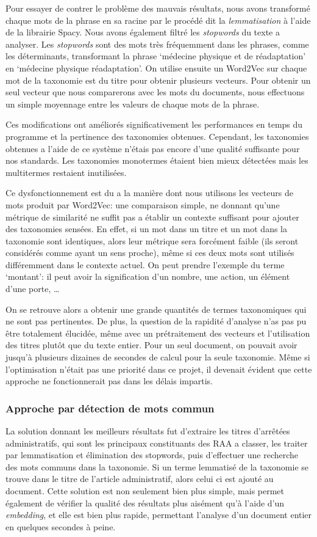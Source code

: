 Pour essayer de contrer le problème des mauvais résultats, nous avons transformé chaque mots de la phrase en sa racine par le procédé dit la \textit{lemmatisation} à l'aide de la librairie Spacy\cite{spacy}.
Nous avons également filtré les \textit{stopwords} du texte a analyser.
Les \textit{stopwords} sont des mots très fréquemment dans les phrases, comme les déterminants, transformant la phrase `médecine physique et de réadaptation' en `médecine physique réadaptation'.
On utilise ensuite un Word2Vec sur chaque mot de la taxonomie est du titre pour obtenir plusieurs vecteurs.
Pour obtenir un seul vecteur que nous comparerons avec les mots du documents, nous effectuons un simple moyennage entre les valeurs de chaque mots de la phrase.


Ces modifications ont améliorés significativement les performances en temps du programme et la pertinence des taxonomies obtenues.
Cependant, les taxonomies obtenues a l'aide de ce système n'étais pas encore d'une qualité suffisante pour nos standards.
Les taxonomies monotermes étaient bien mieux détectées mais les multitermes restaient inutilisées.


Ce dysfonctionnement est du a la manière dont nous utilisons les vecteurs de mots produit par Word2Vec: une comparaison simple, ne donnant qu'une métrique de similarité ne suffit pas a établir un contexte suffisant pour ajouter des taxonomies sensées.
En effet, si un mot dans un titre et un mot dans la taxonomie sont identiques, alors leur métrique sera forcément faible (ils seront considérés comme ayant un sens proche), même si ces deux mots sont utilisés différemment dans le contexte actuel.
On peut prendre l'exemple du terme `montant': il peut avoir la signification d'un nombre, une action, un élément d'une porte, \ldots

On se retrouve alors a obtenir une grande quantités de termes taxonomiques qui ne sont pas pertinentes.
De plus, la question de la rapidité d'analyse n'as pas pu être totalement élucidée, même avec un prétraitement des vecteurs et l'utilisation des titres plutôt que du texte entier.
Pour un seul document, on pouvait avoir jusqu'à plusieurs dizaines de secondes de calcul pour la seule taxonomie.
Même si l'optimisation n'était pas une priorité dans ce projet, il devenait évident que cette approche ne fonctionnerait pas dans les délais impartis.


\subsubsection{Approche par détection de mots commun}
La solution donnant les meilleurs résultats fut d'extraire les titres d'arrêtées administratifs, qui sont les principaux constituants des RAA a classer, les traiter par lemmatisation et élimination des stopwords, puis d'effectuer une recherche des mots communs dans la taxonomie.
Si un terme lemmatisé de la taxonomie se trouve dans le titre de l'article administratif, alors celui ci est ajouté au document.
Cette solution est non seulement bien plus simple, mais permet également de vérifier la qualité des résultats plus aisément qu'à l'aide d'un \textit{embedding}, et elle est bien plus rapide, permettant l'analyse d'un document entier en quelques secondes à peine.

